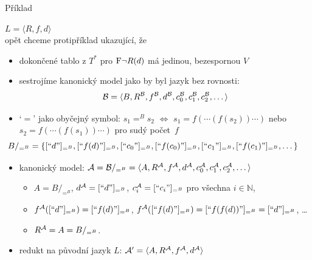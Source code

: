 \documentclass{beamer}
\begin{document}
\begin{frame}{Příklad}

    \pause
     $L=\langle R,f,d \rangle$ \\ opět chceme protipříklad ukazující, že 

    \pause
    \begin{itemize}
        \item dokončené tablo \alert{z $T^*$} pro $\mathrm{F}\neg R(d)$ má jedinou, bezespornou $V$\pause
        \item sestrojíme kanonický model jako by byl jazyk bez rovnosti:\pause
        $$
        \mathcal{B}=\langle B,R^{\mathcal{B}},f^{\mathcal{B}},d^{\mathcal{B}},c_0^{\mathcal{B}},c_1^{\mathcal{B}},c_2^{\mathcal{B}},\dots\rangle
        $$

        \pause
        \item \alert{`$=$' jako obyčejný symbol:} \pause $s_1=^B s_2$ $\Leftrightarrow$ $s_1=f(\cdots (f(s_2))\cdots)$ nebo \small$s_2=f(\cdots (f(s_1))\cdots)$ pro sudý počet~$f$ \pause  
        $$\hspace{-1cm}
        B/_{=^B} = \{[\text{``$d$''}]_{=^B},[\text{``$f(d)$''}]_{=^B},[\text{``$c_0$''}]_{=^B},[\text{``$f(c_0)$''}]_{=^B},[\text{``$c_1$''}]_{=^B},[\text{``$f(c_1)$''}]_{=^B},\dots\}
        $$    

        \pause
        \item \alert{kanonický model}: 
        $\mathcal{A}=\mathcal{B}/_{=^B}=\langle A,R^{\mathcal{A}},f^{\mathcal{A}},d^{\mathcal{A}},c_0^{\mathcal{A}},c_1^{\mathcal{A}},c_2^{\mathcal{A}},\dots\rangle$\pause
        \begin{itemize}
            \item $A=B/_{=^B}$, $d^{\mathcal{A}}=[\text{``$d$''}]_{=^B}$, $c^{\mathcal{A}}_i=[\text{``$c_i$''}]_{=^B}$ pro všechna $i\in \mathbb N$,\pause
            \item $f^{\mathcal{A}}([\text{``$d$''}]_{=^B})=[\text{``$f(d)$''}]_{=^B}$, $f^{\mathcal{A}}([\text{``$f(d)$''}]_{=^B})=[\text{``$f(f(d))$''}]_{=^B}=[\text{``$d$''}]_{=^B}$, \dots\pause
            \item $R^{\mathcal{A}}=A=B/_{=^B}$.\pause
        \end{itemize}        
        \item redukt na původní jazyk $L$: $\mathcal{A}'=\langle A, R^{\mathcal{A}}, f^{\mathcal{A}}, d^{\mathcal{A}}\rangle$
    \end{itemize}

\end{frame}
\end{document}
